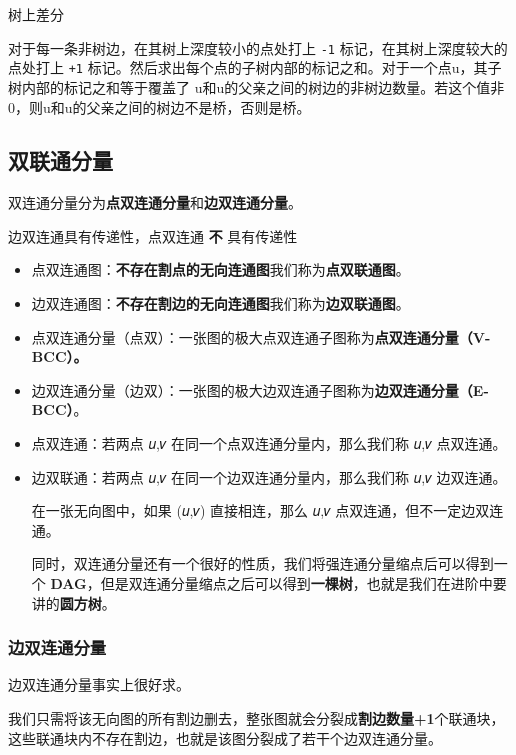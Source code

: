 \documentclass[]{article}
\begin{document}
树上差分

对于每一条非树边，在其树上深度较小的点处打上 \texttt{-1}
标记，在其树上深度较大的点处打上 \texttt{+1}
标记。然后求出每个点的子树内部的标记之和。对于一个点u，其子树内部的标记之和等于覆盖了
u和u的父亲之间的树边的非树边数量。若这个值非0，则u和u的父亲之间的树边不是桥，否则是桥。

\hypertarget{ux53ccux8054ux901aux5206ux91cf}{%
\subsection{双联通分量}\label{ux53ccux8054ux901aux5206ux91cf}}

双连通分量分为\textbf{点双连通分量}和\textbf{边双连通分量}。

边双连通具有传递性，点双连通 \textbf{不} 具有传递性

\begin{itemize}
\item
  点双连通图：\textbf{不存在割点的无向连通图}我们称为\textbf{点双联通图}。
\item
  边双连通图：\textbf{不存在割边的无向连通图}我们称为\textbf{边双联通图}。
\item
  点双连通分量（点双）：一张图的极大点双连通子图称为\textbf{点双连通分量（V-BCC）。}
\item
  边双连通分量（边双）：一张图的极大边双连通子图称为\textbf{边双连通分量（E-BCC）}。
\item
  点双连通：若两点 𝑢,𝑣 在同一个点双连通分量内，那么我们称 𝑢,𝑣 点双连通。
\item
  边双联通：若两点 𝑢,𝑣 在同一个边双连通分量内，那么我们称 𝑢,𝑣 边双连通。

  在一张无向图中，如果 (𝑢,𝑣) 直接相连，那么 𝑢,𝑣
  点双连通，但不一定边双连通。

  同时，双连通分量还有一个很好的性质，我们将强连通分量缩点后可以得到一个
  \textbf{DAG}，但是双连通分量缩点之后可以得到\textbf{一棵树}，也就是我们在进阶中要讲的\textbf{圆方树}。
\end{itemize}

\hypertarget{ux8fb9ux53ccux8fdeux901aux5206ux91cf}{%
\subsubsection{边双连通分量}\label{ux8fb9ux53ccux8fdeux901aux5206ux91cf}}

边双连通分量事实上很好求。

我们只需将该无向图的所有割边删去，整张图就会分裂成\textbf{割边数量+1}个联通块，这些联通块内不存在割边，也就是该图分裂成了若干个边双连通分量。
\end{document}
